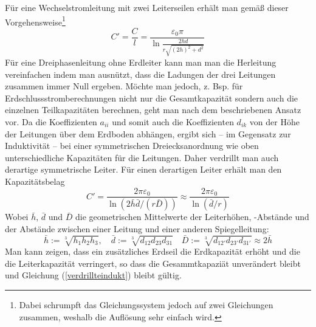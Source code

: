 \documentclass[10pt,a4paper]{article}
\newcommand{\q}{\glqq }
\begin{document}
Für eine Wechselstromleitung mit zwei Leiterseilen erhält man gemäß dieser Vorgehensweise\footnote{Dabei schrumpft das Gleichungssystem jedoch auf zwei Gleichungen zusammen, weshalb die Auflösung sehr einfach wird.}
\begin{equation}
C' = \frac{C}{l} = \frac{\varepsilon_0\pi}{\ln{\frac{2hd}{r\sqrt{\left(2h\right)^2+d^2}}}}
\end{equation}
Für eine Dreiphasenleitung ohne Erdleiter kann man man die Herleitung vereinfachen indem man ausnützt, dass die Ladungen der drei Leitungen zusammen immer Null ergeben. Möchte man jedoch, z. Bsp. für  Erdschlussstromberechnungen nicht nur die Gesamtkapazität sondern auch die einzelnen Teilkapazitäten berechnen, geht man nach dem beschriebenen Ansatz vor.
Da die Koeffizienten $a_{ii}$ und somit auch die Koeffizienten $d_{ik}$ von der Höhe der Leitungen über dem Erdboden abhängen, ergibt sich -- im Gegensatz zur Induktivität -- bei einer symmetrischen Dreiecksanordnung wie oben %
unterschiedliche Kapazitäten für die Leitungen. Daher verdrillt man auch derartige symmetrische Leiter. Für einen derartigen Leiter erhält man den Kapazitätsbelag
\begin{equation}\label{verdrillteindukt}
C' = \frac{2\pi\varepsilon_0}{\ln\left(2 \bar{h}\bar{d}/(r\bar{D})\right) } \approx
\frac{2\pi\varepsilon_0}{\ln\left(\bar{d}/r\right)}
\end{equation}
Wobei $\bar{h}$, $\bar{d}$ und $\bar{D}$ die geometrischen Mittelwerte der Leiterhöhen, -Abstände und der Abstände zwischen einer Leitung und einer anderen \q Spiegelleitung\q : %
\begin{equation}
\bar{h} := \sqrt[3]{h_1h_2h_3}, \quad \bar{d} := \sqrt[3]{d_{12}d_{23}d_{31}} \quad \bar{D} := \sqrt[3]{d_{12'}d_{23'}d_{31'}} \approx 2\bar{h}
\end{equation}
Man kann zeigen, dass ein zusätzliches Erdseil die Erdkapazität erhöht und die die Leiterkapazität verringert, so dass die Gesammtkapaziät unverändert bleibt und Gleichung (\ref{verdrillteindukt}) bleibt gültig.\cite{Flosdorff}
\end{document}
